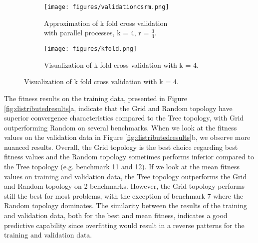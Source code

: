 \begin{figure}
	\begin{subfigure}{0.5\textwidth}\label{fig:csrmkfold}
    \texttt{[image: figures/validationcsrm.png]}
    \caption{Approximation of k fold cross validation \\with parallel processes, k = 4,  r = $\frac{3}{4}$.}
    \end{subfigure}
	\begin{subfigure}{0.5\textwidth}    \label{fig:kfold}

    \centering
    \texttt{[image: figures/kfold.png]}
    \caption{Visualization of k fold cross validation with k = 4.}
    \end{subfigure}%
    \label{fig:ckfold}
 \end{figure}

The fitness results on the training data, presented in Figure \ref{fig:distributedresults}a, indicate that the Grid and Random topology have superior convergence characteristics compared to the Tree topology, with Grid outperforming Random on several benchmarks. When we look at the fitness values on the validation data in Figure \ref{fig:distributedresults}b, we observe more nuanced results. Overall, the Grid topology is the best choice regarding best fitness values and the Random topology sometimes performs inferior compared to the Tree topology (e.g. benchmark 11 and 12). If we look at the mean fitness values on training and validation data, the Tree topology outperforms the Grid and Random topology on 2 benchmarks. However, the Grid topology performs still the best for most problems, with the exception of benchmark 7 where the Random topology dominates. The similarity between the results of the training and validation data, both for the best and mean fitness, indicates a good predictive capability since overfitting would result in a reverse patterns for the training and validation data.

